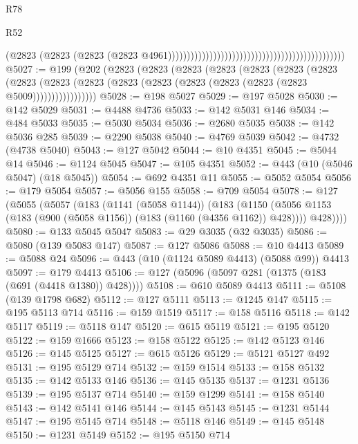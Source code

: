 \begin{lexlean}{R78}
\begin{lexlean}{R52}
\begin{coremodule}
{{{{{{{{{{{{{{{{{{{{{{{{{{{{{{{{{{{{{{{{{{{{{{{{{{{{{{{{{{{{{{{{{{{{{{{{{{{{{{{{{{{{{{{{{{{{{{{{{{{{{{{{{{{{{{{{{{{{{{{{{{{{{{{{{{{{{{{{{{{{{{{{{{{{{{{{{{{{{{{{{{{{{{{{{{{{{{{{{{{{{{{{{{{{{{{{{{{{{{                                                                                          (@2823
                                                                                            (@2823
                                                                                              (@2823
                                                                                                (@2823
                                                                                                  @4961)))))))))))))))))))))))))))))))))))))))))))))))
@5027 := @199
    (@202
      (@2823
        (@2823
          (@2823
            (@2823
              (@2823
                (@2823
                  (@2823
                    (@2823
                      (@2823 (@2823 (@2823 (@2823 (@2823 (@2823 (@2823 (@2823 @5009)))))))))))))))))
@5028 := @198 @5027
@5029 := @197 @5028
@5030 := @142 @5029
@5031 := @4488 @4736
@5033 := @142 @5031 @146
@5034 := @484 @5033
@5035 := @5030 @5034
@5036 := @2680 @5035
@5038 := @142 @5036 @285
@5039 := @2290 @5038
@5040 := @4769 @5039
@5042 := @4732 (@4738 @5040)
@5043 := @127 @5042
@5044 := @10 @4351
@5045 := @5044 @14
@5046 := @1124 @5045
@5047 := @105 @4351
@5052 := @443 (@10 (@5046 @5047) (@18 @5045))
@5054 := @692 @4351 @11
@5055 := @5052 @5054
@5056 := @179 @5054
@5057 := @5056 @155
@5058 := @709 @5054
@5078 := @127
    (@5055
      (@5057
        (@183
          (@1141 (@5058 @1144))
          (@183
            (@1150 (@5056 @1153 (@183 (@900 (@5058 @1156)) (@183 (@1160 (@4356 @1162)) @428))))
            @428))))
@5080 := @133 @5045 @5047
@5083 := @29 @3035 (@32 @3035)
@5086 := @5080 (@139 @5083 @147)
@5087 := @127 @5086
@5088 := @10 @4413
@5089 := @5088 @24
@5096 := @443 (@10 (@1124 @5089 @4413) (@5088 @99)) @4413
@5097 := @179 @4413
@5106 := @127 (@5096 (@5097 @281 (@1375 (@183 (@691 (@4418 @1380)) @428))))
@5108 := @610 @5089 @4413
@5111 := @5108 (@139 @1798 @682)
@5112 := @127 @5111
@5113 := @1245 @147
@5115 := @195 @5113 @714
@5116 := @159 @1519
@5117 := @158 @5116
@5118 := @142 @5117
@5119 := @5118 @147
@5120 := @615 @5119
@5121 := @195 @5120
@5122 := @159 @1666
@5123 := @158 @5122
@5125 := @142 @5123 @146
@5126 := @145 @5125
@5127 := @615 @5126
@5129 := @5121 @5127 @492
@5131 := @195 @5129 @714
@5132 := @159 @1514
@5133 := @158 @5132
@5135 := @142 @5133 @146
@5136 := @145 @5135
@5137 := @1231 @5136
@5139 := @195 @5137 @714
@5140 := @159 @1299
@5141 := @158 @5140
@5143 := @142 @5141 @146
@5144 := @145 @5143
@5145 := @1231 @5144
@5147 := @195 @5145 @714
@5148 := @5118 @146
@5149 := @145 @5148
@5150 := @1231 @5149
@5152 := @195 @5150 @714
}}}}}}}}}}}}}}}}}}}}}}}}}}}}}}}}}}}}}}}}}}}}}}}}}}}}}}}}}}}}}}}}}}}}}}}}}}}}}}}}}}}}}}}}}}}}}}}}}}}}}}}}}}}}}}}}}}}}}}}}}}}}}}}}}}}}}}}}}}}}}}}}}}}}}}}}}}}}}}}}}}}}}}}}}}}}}}}}}}}}}}}}}}}}}}}}}}}}}}
\end{coremodule}
\end{lexlean}
\end{lexlean}
